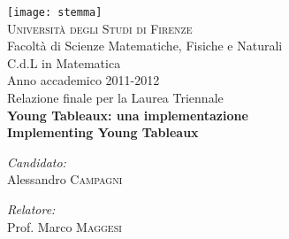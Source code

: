 \begin{titlepage}
\begin{center}

\texttt{[image: stemma]}~\\[1cm]

\textsc{\LARGE Universit\`a degli Studi di Firenze}\\[1.5cm]

\LARGE Facolt\`a di Scienze Matematiche, Fisiche e Naturali\\
\LARGE C.d.L in Matematica\\[0.5cm]

\Large Anno accademico 2011-2012\\
\Large Relazione finale per la Laurea Triennale\\[1.5cm]

{ \huge \bfseries Young Tableaux: una implementazione}\\[1.0cm]
{ \LARGE \bfseries Implementing Young Tableaux}\\[0.4cm]


\vfill


\begin{minipage}{0.4\textwidth}
\begin{flushleft} \large
\emph{Candidato:}\\
Alessandro \textsc{Campagni}
\end{flushleft}
\end{minipage}
\begin{minipage}{0.4\textwidth}
\begin{flushright} \large
\emph{Relatore:} \\
Prof. Marco \textsc{Maggesi}
\end{flushright}
\end{minipage}

\end{center}
\end{titlepage}
